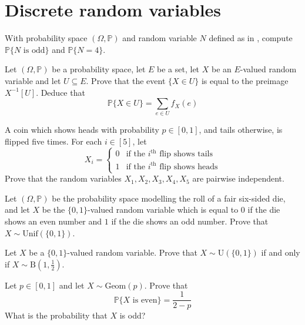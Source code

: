 \section{Discrete random variables}



\begin{exercise}
With probability space $(\Omega,\mathbb{P})$ and random variable $N$ defined as in , compute $\mathbb{P}\{N \text{ is odd}\}$ and $\mathbb{P}\{N = 4\}$.
\end{exercise}


\begin{exercise}
Let $(\Omega, \mathbb{P})$ be a probability space, let $E$ be a set, let $X$ be an $E$-valued random variable and let $U \subseteq E$. Prove that the event $\{X \in U\}$ is equal to the preimage $X^{-1}[U]$. Deduce that
\[ \mathbb{P}\{X \in U\} = \sum_{e \in U} f_X(e) \]
\end{exercise}



\begin{exercise}
A coin which shows heads with probability $p \in [0,1]$, and tails otherwise, is flipped five times. For each $i \in [5]$, let
\[ X_i = \begin{cases} 0 & \text{if the } i^{\text{th}} \text{ flip shows tails} \\
1 & \text{if the } i^{\text{th}} \text{ flip shows heads} \end{cases} \]
Prove that the random variables $X_1,X_2,X_3,X_4,X_5$ are pairwise independent.
\end{exercise}



\begin{exercise}
Let $(\Omega,\mathbb{P})$ be the probability space modelling the roll of a fair six-sided die, and let $X$ be the $\{0,1\}$-valued random variable which is equal to $0$ if the die shows an even number and $1$ if the die shows an odd number. Prove that $X \sim \mathrm{Unif}(\{0,1\})$.
\end{exercise}


\begin{exercise}
Let $X$ be a $\{0,1\}$-valued random variable. Prove that $X \sim \mathrm{U}(\{0,1\})$ if and only if $X \sim \mathrm{B}(1,\frac{1}{2})$.
\end{exercise}



\begin{exercise}
Let $p \in [0,1]$ and let $X \sim \mathrm{Geom}(p)$. Prove that
\[ \mathbb{P}\{X \text{ is even}\} = \frac{1}{2-p} \]
What is the probability that $X$ is odd?
\end{exercise}

